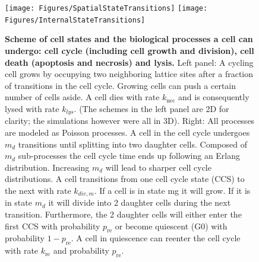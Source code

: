 \documentclass[10pt,letterpaper]{article}
\begin{document}
\begin{figure}[htbp]
\texttt{[image: Figures/SpatialStateTransitions]}
\texttt{[image: Figures/InternalStateTransitions]}
\caption{{\bf Scheme of cell states and the biological processes a cell can undergo: cell cycle (including cell growth and division), cell death (apoptosis and necrosis) and lysis.}
 Left panel: A cycling cell grows by occupying two neighboring lattice sites after a fraction of transitions in the cell cycle. Growing cells can push a certain number of cells aside. A cell dies with rate $k_{\text{nec}}$ and is consequently lysed with rate $k_{lys}$. (The schemes in the left panel are 2D for clarity; the simulations however were all in 3D). Right: All processes are modeled as Poisson processes. A cell in the cell cycle undergoes $m_d$ transitions until splitting into two daughter cells. Composed of $m_d$ sub-processes the cell cycle time ends up following an Erlang distribution. Increasing $m_d$ will lead to sharper cell cycle distributions. A cell transitions from one cell cycle state (CCS) to the next with rate $k_{div,m}$. If a cell is in state mg it will grow. If it is in state $m_d$ it will divide into 2 daughter cells during the next transition. Furthermore, the 2 daughter cells will either enter the first CCS with probability $p_{\text{re}}$ or become quiescent (G0) with probability $1 - p_{\text{re}}$. A cell in quiescence can reenter the cell cycle with rate $k_{\text{re}}$ and probability $p_{\text{re}}$.
}
\label{fig:cell-states}
\end{figure}
\end{document}
